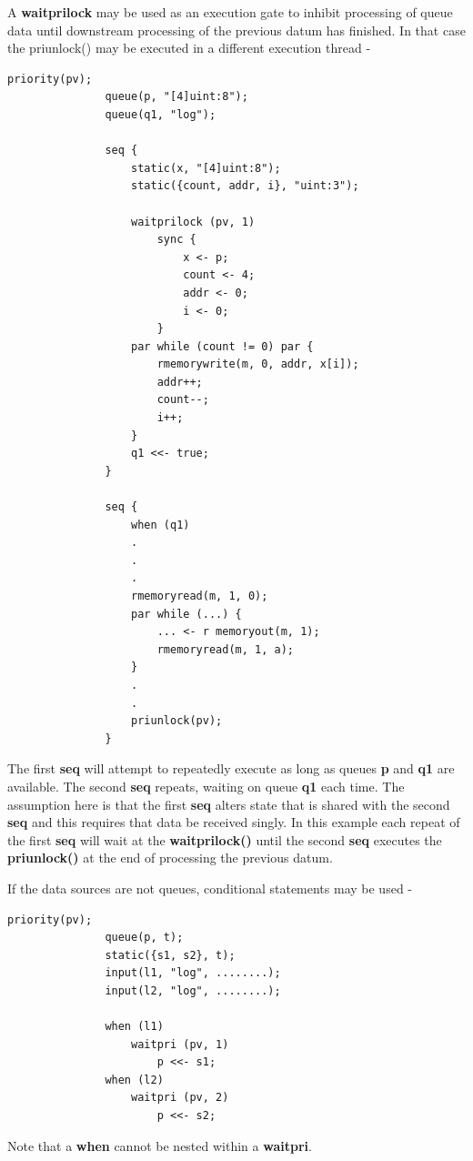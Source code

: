         A {\bf waitprilock} may be used as an execution gate to inhibit
        processing of queue data until downstream processing of the previous
        datum has finished. In that case the priunlock() may be executed
        in a different execution thread -
        \begin{lstlisting}[gobble=8, language=threepl]
               priority(pv);
               queue(p, "[4]uint:8");
               queue(q1, "log");

               seq {
                   static(x, "[4]uint:8");
                   static({count, addr, i}, "uint:3");
                   
                   waitprilock (pv, 1)
                       sync {
                           x <- p;
                           count <- 4;
                           addr <- 0;
                           i <- 0;
                       }
                   par while (count != 0) par {
                       rmemorywrite(m, 0, addr, x[i]);
                       addr++;
                       count--;
                       i++;
                   }
                   q1 <<- true;
               }
               
               seq {
                   when (q1)
                   .
                   .
                   .
                   rmemoryread(m, 1, 0);
                   par while (...) {
                       ... <- r memoryout(m, 1);
                       rmemoryread(m, 1, a);
                   }
                   .
                   .
                   priunlock(pv);
               }
        \end{lstlisting}
        The first {\bf seq} will attempt to repeatedly execute as long as
        queues {\bf p} and {\bf q1} are available. The second {\bf seq}
        repeats, waiting on queue {\bf q1} each time. The assumption here is
        that the first {\bf seq} alters state that is shared with the second
        {\bf seq} and this requires that data be received singly. In
        this example each repeat of the first {\bf seq} will wait at the {\bf
        waitprilock()} until the second {\bf seq} executes the {\bf
        priunlock()} at the end of processing the previous datum.

        If the data sources are not queues, conditional statements may
        be used -
        \begin{lstlisting}[gobble=8, language=threepl]
               priority(pv);
               queue(p, t);
               static({s1, s2}, t);
               input(l1, "log", ........);
               input(l2, "log", ........);
               
               when (l1)
                   waitpri (pv, 1)
                       p <<- s1;
               when (l2)
                   waitpri (pv, 2)
                       p <<- s2;
        \end{lstlisting}
        Note that a {\bf when} cannot be nested within a {\bf waitpri}.
        
